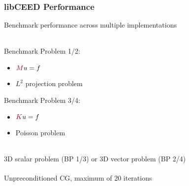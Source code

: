 \documentclass{beamer}
\begin{document}
\begin{frame}
\begin{center}
\frametitle{libCEED Performance}

Benchmark performance across multiple implementations\\

~\\

\begin{multicols}{2}

\begin{flushleft}
Benchmark Problem 1/2:
\end{flushleft}

\begin{itemize}

\item ${\color{burgundy}M} u = f$

\item $L^2$ projection problem

\end{itemize}

\begin{flushleft}
Benchmark Problem 3/4:
\end{flushleft}

\begin{itemize}

\item ${\color{burgundy}K} u = f$

\item Poisson problem

\end{itemize}

\end{multicols}

\begin{flushleft}

~\\

3D scalar problem (BP 1/3) or 3D vector problem (BP 2/4)\\

~\\

Unpreconditioned CG, maximum of 20 iterations\\

\end{flushleft}

\end{center}
\end{frame}

\end{document}
